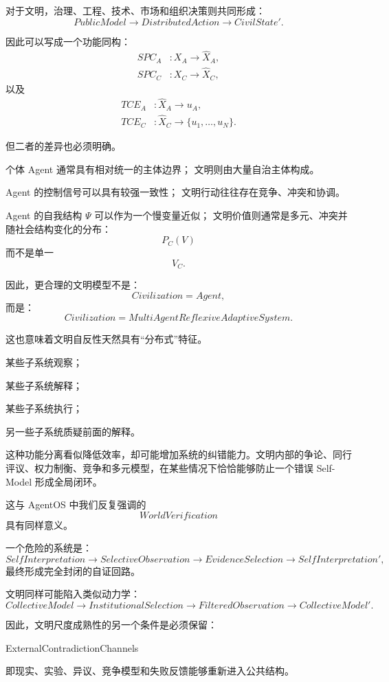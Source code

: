 对于文明，治理、工程、技术、市场和组织决策则共同形成：
\[
PublicModel
\rightarrow
DistributedAction
\rightarrow
CivilState'.
\]

因此可以写成一个功能同构：
\[
\begin{aligned}
SPC_A
&:
X_A\rightarrow \hat X_A,\\
SPC_C
&:
X_C\rightarrow \hat X_C,
\end{aligned}
\]
以及
\[
\begin{aligned}
TCE_A
&:
\hat X_A\rightarrow u_A,\\
TCE_C
&:
\hat X_C\rightarrow \{u_1,\ldots,u_N\}.
\end{aligned}
\]

但二者的差异也必须明确。

个体 Agent 通常具有相对统一的主体边界；
文明则由大量自治主体构成。

Agent 的控制信号可以具有较强一致性；
文明行动往往存在竞争、冲突和协调。

Agent 的自我结构 $\Psi$ 可以作为一个慢变量近似；
文明价值则通常是多元、冲突并随社会结构变化的分布：
\[
P_C(V)
\]
而不是单一
\[
V_C.
\]

因此，更合理的文明模型不是：
\[
Civilization=Agent,
\]
而是：
\[
\boxed{
Civilization
=
MultiAgentReflexiveAdaptiveSystem.
}
\]

这也意味着文明自反性天然具有“分布式”特征。

某些子系统观察；

某些子系统解释；

某些子系统执行；

另一些子系统质疑前面的解释。

这种功能分离看似降低效率，却可能增加系统的纠错能力。文明内部的争论、同行评议、权力制衡、竞争和多元模型，在某些情况下恰恰能够防止一个错误 Self-Model 形成全局闭环。

这与 AgentOS 中我们反复强调的
\[
WorldVerification
\]
具有同样意义。

一个危险的系统是：
\[
SelfInterpretation
\rightarrow
SelectiveObservation
\rightarrow
EvidenceSelection
\rightarrow
SelfInterpretation',
\]
最终形成完全封闭的自证回路。

文明同样可能陷入类似动力学：
\[
CollectiveModel
\rightarrow
InstitutionalSelection
\rightarrow
FilteredObservation
\rightarrow
CollectiveModel'.
\]

因此，文明尺度成熟性的另一个条件是必须保留：
\begin{statementbox}
ExternalContradictionChannels
\end{statementbox}
即现实、实验、异议、竞争模型和失败反馈能够重新进入公共结构。

